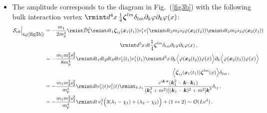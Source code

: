 \begin{itemize}
\begin{align}
\begin{split}
        =-\frac{4m_1 m_2^2 s_2^2}{m_p^4}\rmint dt \Big[(-2\lambda_1+2\chi_1-\lambda_2+\chi_2)v_1^2+(\lambda_2-\chi_2)(\boldsymbol{v}_1\cdot\Hat{n})^2\Big]\\&\,\,\,\,\,\,\,\,\,\,\,\,\,\,\,\,\,\,\,\,\,\,\,\,\,\,\,\,\,\,\,\,\,\,\,\,\,\ +(1\leftrightarrow2)\sim \mathcal{O}(Lv^4)\,.
        \label{4.38}
    \end{split}
\end{align}
\vspace{-0.4cm}
The calculation and the functions $\lambda_{1,2}(r)$, $\chi_{1,2}(r)$ are explicitly given in Appendix~ (\ref{ch1:app:B}).
\vspace{0.2cm}
\item The amplitude corresponds to the diagram in Fig.~(\ref{fig3b}) with the following bulk interaction vertex $\rmint d^4x\,\frac{1}{4}\boldsymbol{\zeta}^{lm}\delta_{lm}\partial_{k}\varphi\partial_{k}\varphi(x)$:
\begin{align}
    \begin{split}
          \mathcal{S}_{\text{eff}}\Big |_{\text{fig}(\ref{fig3b})}&=-\frac{m_1}{2m_p^4}\rmint\Bar{\mathcal{D}}\Hat{\xi}\rmint dt_1 \boldsymbol{\zeta}_{ij}(\boldsymbol{x}_1(t_1))v_1^i v_1^j\rmint dt_2 m_2 s_2 \varphi(\boldsymbol{x}_2(t_2))\rmint dt_2 m_2 s_2 \varphi(\boldsymbol{x}_2(t_3))\\&\hspace{5cm}\rmint d^3x \,dt\frac{1}{4}\boldsymbol{\zeta}^{lm}\delta_{lm}\partial_{k}\varphi\partial_{k}\varphi(x)\,,\\ &
        =-\frac{m_1 m_2^2 s_2^2}{8 m_p^4}\rmint dt_1 dt_2 dt_3 dt v_{1}^i(t_1)v_1^j(t_1) \rmint d^3x \,\partial_{k}\Big\langle\varphi(\boldsymbol{x}_2(t_2))\varphi(x)\Big\rangle \partial_{k}\Big\langle\varphi(\boldsymbol{x}_2(t_3))\varphi(x)\Big\rangle
       \\&\hspace{8.5cm} \Big\langle\boldsymbol{\zeta}_{ij}(\boldsymbol{x}_1(t_1))\boldsymbol{\zeta}^{lm}(x)\Big\rangle \delta_{lm}\,,\\ &
        =-\frac{m_1 m_2^2 s_2^2}{ m_p^4}\rmint dt v_1^{i}(t)v_1^j(t)\rmint_{k,k_1}\frac{e^{i\boldsymbol{k}\cdot \boldsymbol{r}}(\boldsymbol{k}_1^2-\boldsymbol{k}\cdot \boldsymbol{k}_1)}{(\boldsymbol{k}_1^2+m^2)[(\boldsymbol{k}_1-\boldsymbol{k})^2+m^2]\boldsymbol{k}^2}\delta_{ij}\,,\\ &
        =-\frac{m_1 m_2^2 s_2^2}{m_p^4}\rmint dt\, v_1^2\Big(3(\lambda_1-\chi_1)+(\lambda_2-\chi_2)\Big)+(1\leftrightarrow 2)\sim \mathcal{O}(Lv^4)\,.
    \end{split}

\end{align}
\end{itemize}
